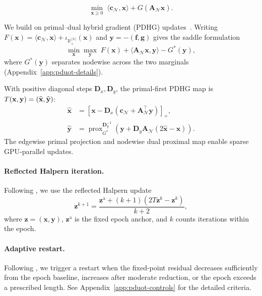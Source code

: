\begin{equation}
\label{eq:restricted-uot-vector}
\min_{\mathbf{x}\geq0}\;\langle \mathbf{c}_{\mathcal{N}},\mathbf{x}\rangle+G(\mathbf{A}_{\mathcal N}\mathbf{x}).
\end{equation}

We build \subsolver on primal--dual hybrid gradient (PDHG) updates~\citep{esser2010general,chambolle2011first}.
Writing $F(\mathbf x)=\langle\mathbf c_{\mathcal N},\mathbf x\rangle+\iota_{\mathbb R_+^{|\mathcal N|}}(\mathbf x)$ and $\mathbf y=-(\mathbf f,\mathbf g)$ gives the saddle formulation
\begin{equation*}
\min_{\mathbf{x}}\max_{\mathbf{y}}\;F(\mathbf{x})+\langle \mathbf{A}_{\mathcal N}\mathbf{x},\mathbf{y}\rangle-G^*(\mathbf{y}),
\end{equation*}
where $G^*(\mathbf{y})$ separates nodewise across the two marginals (Appendix~\ref{app:pduot-details}).

With positive diagonal steps $\mathbf D_x,\mathbf D_y$, the primal-first PDHG map is $T(\mathbf x,\mathbf y)=(\widehat{\mathbf x},\widehat{\mathbf y})$:
\begin{equation}
\label{eq:pduot-map}
\begin{aligned}
\widehat{\mathbf{x}}&=\left[\mathbf{x}-\mathbf{D}_x(\mathbf{c}_{\mathcal{N}}+\mathbf{A}_{\mathcal N}^\top \mathbf{y})\right]_+,\\
\widehat{\mathbf{y}}&=\operatorname{prox}_{G^*}^{\mathbf{D}_y^{-1}}\left(\mathbf{y}+\mathbf{D}_y\mathbf{A}_{\mathcal N}(2\widehat{\mathbf{x}}-\mathbf{x})\right).
\end{aligned}
\end{equation} 
The edgewise primal projection and nodewise dual proximal map enable sparse GPU-parallel updates.

\paragraph{Reflected Halpern iteration.}
Following \citet{lu2024restarted,lin2025practical}, we use the reflected Halpern update
\begin{equation*}
\mathbf z^{k+1}
=\frac{\mathbf z^{\mathrm a}+(k+1)(2T\mathbf z^k-\mathbf z^k)}{k+2},
\end{equation*}
where $\mathbf z=(\mathbf x,\mathbf y)$, $\mathbf z^{\mathrm a}$ is the fixed epoch anchor, and $k$ counts iterations within the epoch.

\paragraph{Adaptive restart.}
Following \citet{lu2025cupdlpx}, we trigger a restart when the fixed-point residual decreases sufficiently from the epoch baseline, increases after moderate reduction, or the epoch exceeds a prescribed length.
See Appendix~\ref{app:pduot-controls} for the detailed criteria. 

